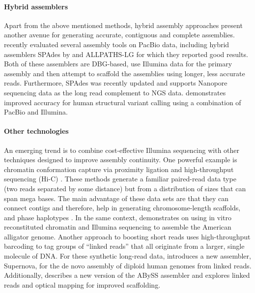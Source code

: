\paragraph{Hybrid assemblers}
Apart from the above mentioned methods, hybrid assembly approaches present another avenue for generating accurate, contiguous and complete assemblies. 
\cite{liao2015completing} recently evaluated several assembly tools on PacBio data, including hybrid assemblers SPAdes by \cite{bankevich2012spades} and ALLPATHS-LG \citep{gnerre2011high} 
for which they reported good results. Both of these assemblers are DBG-based, use Illumina data for the primary assembly and then attempt to scaffold the assemblies using longer, less accurate reads. 
Furthermore, SPAdes was recently updated and supports Nanopore sequencing data as the long read complement to NGS data. 
\cite{fan2017hysa} demonstrates improved accuracy for human structural variant calling using a combination of PacBio and Illumina.

\paragraph{Other technologies}
An emerging trend is to combine cost-effective Illumina sequencing with other techniques designed to improve assembly continuity. 
One powerful example is chromatin conformation capture via proximity ligation and high-throughput sequencing (Hi-C) \citep{lieberman2009comprehensive}. 
These methods generate a familiar paired-read data type (two reads separated by some distance) but from a distribution of sizes that can span mega bases. 
The main advantage of these data sets are that they can connect contigs and therefore, help in generating chromosome-length scaffolds, and phase haplotypes \citep{burton2013chromosome, selvaraj2013whole}. 
In the same context, \cite{rice2017improved} demonstrates on using in vitro reconstituted chromatin and Illumina sequencing to assemble the American alligator genome. 
Another approach to boosting short reads uses high-throughput barcoding to tag groups of ``linked reads'' that all originate from a larger, single molecule of DNA. 
For these synthetic long-read data, \cite{weisenfeld2017direct} introduces a new assembler, Supernova, for the de novo assembly of diploid human genomes from linked reads. 
Additionally, \cite{jackman2017abyss} describes a new version of the ABySS assembler and explores linked reads and optical mapping for improved scaffolding.
